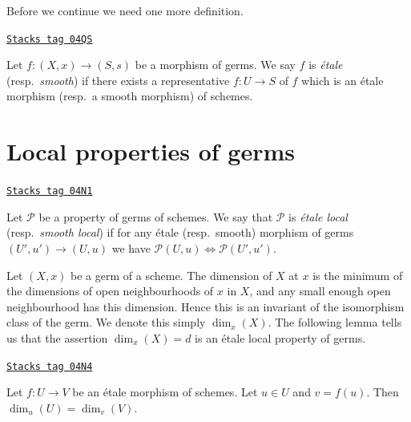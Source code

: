 Before we continue we need one more definition.

\begin{definition}
\label{descent-definition-etale-morphism-germs}
\href{https://stacks.math.columbia.edu/tag/04QS}{\texttt{Stacks tag 04QS}}

Let $f : (X, x) \to (S, s)$ be a morphism of germs.
We say $f$ is {\it \'etale} (resp.\ {\it smooth}) if there exists a
representative $f : U \to S$ of $f$ which is an \'etale morphism
(resp.\ a smooth morphism) of schemes.
\end{definition}

\section{Local properties of germs}
\label{descent-section-properties-germs-local}
\begin{definition}
\label{descent-definition-local-at-point}
\href{https://stacks.math.columbia.edu/tag/04N1}{\texttt{Stacks tag 04N1}}

Let $\mathcal{P}$ be a property of germs of schemes.
We say that $\mathcal{P}$ is {\it \'etale local}
(resp.\ {\it smooth local}) if for any
\'etale (resp.\ smooth) morphism of germs $(U', u') \to (U, u)$
we have $\mathcal{P}(U, u) \Leftrightarrow \mathcal{P}(U', u')$.
\end{definition}

Let $(X, x)$ be a germ of a scheme.
The dimension of $X$ at $x$ is the minimum of the dimensions of
open neighbourhoods of $x$ in $X$, and any small enough open neighbourhood
has this dimension. Hence this is an invariant of the isomorphism class
of the germ. We denote this simply $\dim_x(X)$.
The following lemma tells us that the assertion
$\dim_x(X) = d$ is an \'etale local property of germs.

\begin{lemma}
\label{descent-lemma-dimension-at-point-local}
\href{https://stacks.math.columbia.edu/tag/04N4}{\texttt{Stacks tag 04N4}}

Let $f : U \to V$ be an \'etale morphism of schemes.
Let $u \in U$ and $v = f(u)$. Then $\dim_u(U) = \dim_v(V)$.
\end{lemma}

